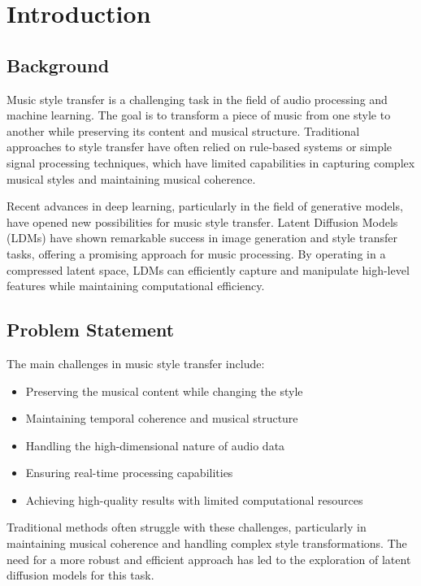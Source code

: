 \section{Introduction}

\subsection{Background}
Music style transfer is a challenging task in the field of audio processing and machine learning. The goal is to transform a piece of music from one style to another while preserving its content and musical structure. Traditional approaches to style transfer have often relied on rule-based systems or simple signal processing techniques, which have limited capabilities in capturing complex musical styles and maintaining musical coherence.

Recent advances in deep learning, particularly in the field of generative models, have opened new possibilities for music style transfer. Latent Diffusion Models (LDMs) have shown remarkable success in image generation and style transfer tasks, offering a promising approach for music processing. By operating in a compressed latent space, LDMs can efficiently capture and manipulate high-level features while maintaining computational efficiency.

\subsection{Problem Statement}
The main challenges in music style transfer include:
\begin{itemize}
    \item Preserving the musical content while changing the style
    \item Maintaining temporal coherence and musical structure
    \item Handling the high-dimensional nature of audio data
    \item Ensuring real-time processing capabilities
    \item Achieving high-quality results with limited computational resources
\end{itemize}

Traditional methods often struggle with these challenges, particularly in maintaining musical coherence and handling complex style transformations. The need for a more robust and efficient approach has led to the exploration of latent diffusion models for this task.

